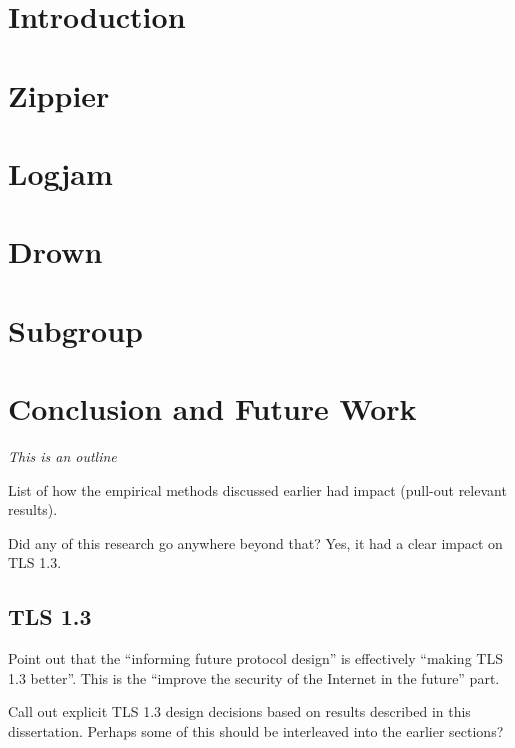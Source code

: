 







\chapter{Introduction}


\chapter{Zippier}
\label{chapter:zippier}

\chapter{Logjam}
\label{chapter:logjam}

\chapter{Drown}
\label{chapter:drown}

\chapter{Subgroup}
\label{chapter:subgroup}


\chapter{Conclusion and Future Work}
\label{chapter:conclusion}

\textit{This is an outline}

List of how the empirical methods discussed earlier had impact
(pull-out relevant results).

Did any of this research go anywhere beyond that? Yes, it had a clear impact
on TLS 1.3.

\section{TLS 1.3}

Point out that the ``informing future protocol design'' is effectively
``making TLS 1.3 better''. This is the ``improve the security of the Internet
in the future'' part.

Call out explicit TLS 1.3 design decisions based on results described in this
dissertation. Perhaps some of this should be interleaved into the earlier
sections?


